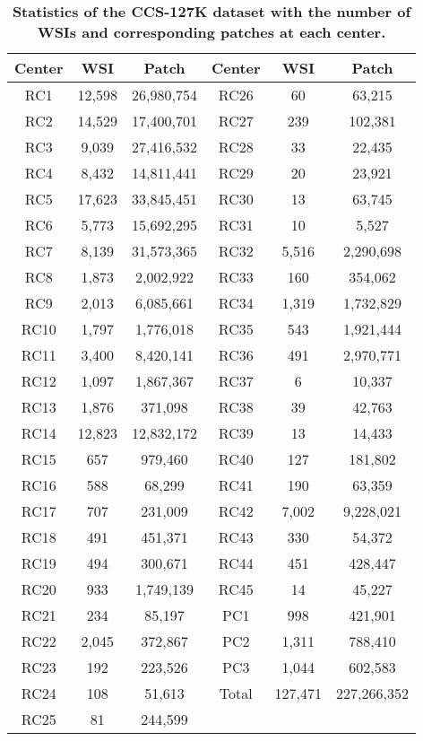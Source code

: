 \newpage
\begin{table}[h] 
\renewcommand{\arraystretch}{1.5}
\renewcommand{\tablename}{Extended Data Table.}
\centering 
\caption{\textbf{Statistics of the CCS-127K dataset with the number of WSIs and corresponding patches at each center.}}
\begin{tabular}{c|c|c|c|c|c} 
\hline
 \rowcolor{cusyellow} \textbf{Center} & \textbf{WSI} & \textbf{Patch} & \textbf{Center} & \textbf{WSI} & \textbf{Patch} \\
\hline
 RC1 & 12,598 & 26,980,754   & RC26 & 60 & 63,215\\
 \rowcolor{cusyellowl}  RC2 & 14,529 & 17,400,701&  RC27 & 239 & 102,381\\
 RC3 & 9,039  & 27,416,532 & RC28 & 33& 22,435\\
 \rowcolor{cusyellowl}  RC4 &8,432 & 14,811,441 &  RC29 & 20 & 23,921 \\
 RC5 & 17,623 & 33,845,451& RC30 & 13 & 63,745\\
 \rowcolor{cusyellowl}  RC6 & 5,773 & 15,692,295 &  RC31 & 10& 5,527\\
 RC7 & 8,139 & 31,573,365 & RC32 & 5,516 & 2,290,698\\
 \rowcolor{cusyellowl}  RC8 & 1,873 & 2,002,922&  RC33 & 160 &354,062\\
 RC9 & 2,013 & 6,085,661 & RC34 & 1,319 & 1,732,829\\
 \rowcolor{cusyellowl}  RC10 &  1,797 & 1,776,018 &  RC35 & 543 & 1,921,444 \\
 RC11 & 3,400 & 8,420,141 & RC36 & 491 & 2,970,771\\
 \rowcolor{cusyellowl}  RC12 & 1,097 & 1,867,367&  RC37 & 6& 10,337\\
 RC13 &  1,876 & 371,098 & RC38 & 39 & 42,763 \\
 \rowcolor{cusyellowl}  RC14 & 12,823 & 12,832,172 &  RC39 & 13& 14,433\\
 RC15 & 657 & 979,460 & RC40 & 127 & 181,802 \\
 \rowcolor{cusyellowl}  RC16 &588 & 68,299 &  RC41 & 190 & 63,359\\
 RC17 & 707 & 231,009 & RC42 & 7,002 & 9,228,021\\
 \rowcolor{cusyellowl}  RC18 & 491 & 451,371 &  RC43 & 330 & 54,372\\
 RC19 &494 & 300,671 &  RC44 & 451 & 428,447 \\
 \rowcolor{cusyellowl}  RC20 & 933 & 1,749,139 &  RC45 & 14 & 45,227 \\
 RC21 & 234 & 85,197 & PC1 & 998 & 421,901\\
 \rowcolor{cusyellowl}  RC22 & 2,045 & 372,867 &  PC2 & 1,311 & 788,410\\
 RC23 & 192 & 223,526 & PC3 &1,044 & 602,583\\
 \rowcolor{cusyellowl}  RC24 & 108 & 51,613&  Total & 127,471& 227,266,352\\
RC25 & 81 & 244,599& & & \\
\hline
\end{tabular} 
\label{ST_patches}
\end{table}

